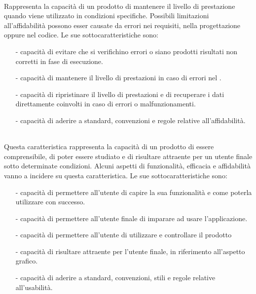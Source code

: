 \documentclass[a4paper, titlepage]{article}
\begin{document}
\begin{description}
\item {}
\\ Rappresenta la capacità di un prodotto  di mantenere il livello di prestazione quando viene utilizzato in condizioni specifiche. Possibili limitazioni all'affidabilità possono esser causate da errori nei requisiti, nella progettazione oppure nel codice.
\newline Le sue sottocaratteristiche sono: 
\begin{itemize}
\item[-] capacità di evitare che si verifichino errori o siano prodotti risultati non corretti in fase di esecuzione.
\item[-] capacità di mantenere il livello di prestazioni in caso di errori nel .
\item[-] capacità di ripristinare il livello di prestazioni e di recuperare i dati direttamente coinvolti in caso di errori o malfunzionamenti.
\item[-] capacità di aderire a standard, convenzioni e regole relative all'affidabilità.
\\
\end{itemize}
\item {}
\\ Questa caratteristica rappresenta la capacità di un prodotto  di essere comprensibile, di poter essere studiato e di risultare attraente per un utente finale sotto determinate condizioni.
Alcuni aspetti di funzionalità, efficacia e affidabilità vanno a incidere su questa caratteristica.
\newline Le sue sottocaratteristiche sono:
\begin{itemize}
\item[-] capacità di permettere all'utente di capire la sua funzionalità e come poterla utilizzare con successo.
\item[-] capacità di permettere all'utente finale di imparare ad usare l'applicazione.
\item[-] capacità di permettere all'utente di utilizzare e controllare il prodotto
\item[-] capacità di risultare attraente per l'utente finale, in riferimento all'aspetto grafico.
\item[-] capacità di aderire a standard, convenzioni, stili e regole relative all'usabilità.
\\
\end{itemize}


\end{description}
\end{document}
